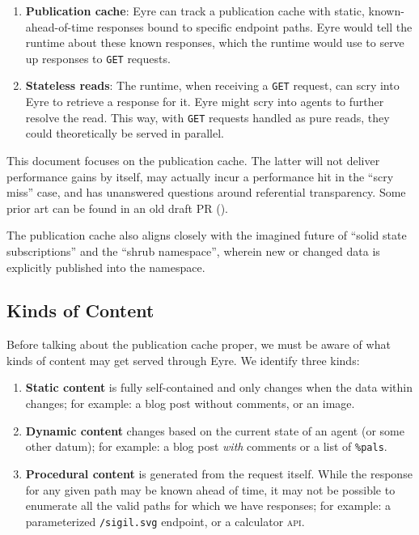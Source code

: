 \documentclass[twoside]{article}
\begin{document}
\begin{enumerate}
  \item  {\bf Publication cache}: Eyre can track a publication cache with static, known-ahead-of-time responses bound to specific endpoint paths. Eyre would tell the runtime about these known responses, which the runtime would use to serve up responses to \texttt{GET} requests.
  \item  {\bf Stateless reads}: The runtime, when receiving a \texttt{GET} request, can scry into Eyre to retrieve a response for it. Eyre might scry into agents to further resolve the read. This way, with \texttt{GET} requests handled as pure reads, they could theoretically be served in parallel.
\end{enumerate}

This document focuses on the publication cache. The latter will not deliver performance gains by itself, may actually incur a performance hit in the ``scry miss'' case, and has unanswered questions around referential transparency. Some prior art can be found in an old draft PR ().

The publication cache also aligns closely with the imagined future of ``solid state subscriptions'' and the ``shrub namespace'', wherein new or changed data is explicitly published into the namespace.

\subsection{Kinds of Content}

Before talking about the publication cache proper, we must be aware of what kinds of content may get served through Eyre. We identify three kinds:

\begin{enumerate}
  \item  {\bf Static content} is fully self-contained and only changes when the data within changes; for example: a blog post without comments, or an image.
  \item  {\bf Dynamic content} changes based on the current state of an agent (or some other datum); for example: a blog post \emph{with} comments or a list of \lstinline[style=inlinecode]{%pals}.
  \item  {\bf Procedural content} is generated from the request itself. While the response for any given path may be known ahead of time, it may not be possible to enumerate all the valid paths for which we have responses; for example: a parameterized \lstinline[style=inlinecode]{/sigil.svg} endpoint, or a calculator \textsc{api}.
\end{enumerate}
\end{document}
